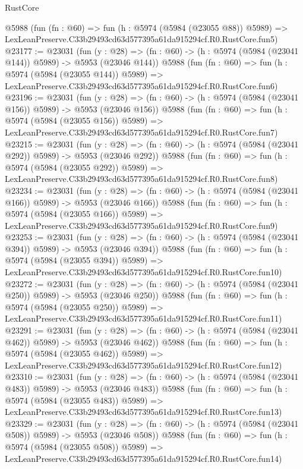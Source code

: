 \begin{lexlean}{RustCore}
\begin{coremodule}
    @5988
    (fun (fn : @60) =>
    fun (h : @5974 (@5984 (@23055 @88)) @5989) =>
    LexLeanPreserve.C33b29493cd63d577395a61da915294cf.R0.RustCore.fun5)
@23177 := @23031
    (fun (y : @28) => (fn : @60) -> (h : @5974 (@5984 (@23041 @144)) @5989) -> @5953 (@23046 @144))
    @5988
    (fun (fn : @60) =>
    fun (h : @5974 (@5984 (@23055 @144)) @5989) =>
    LexLeanPreserve.C33b29493cd63d577395a61da915294cf.R0.RustCore.fun6)
@23196 := @23031
    (fun (y : @28) => (fn : @60) -> (h : @5974 (@5984 (@23041 @156)) @5989) -> @5953 (@23046 @156))
    @5988
    (fun (fn : @60) =>
    fun (h : @5974 (@5984 (@23055 @156)) @5989) =>
    LexLeanPreserve.C33b29493cd63d577395a61da915294cf.R0.RustCore.fun7)
@23215 := @23031
    (fun (y : @28) => (fn : @60) -> (h : @5974 (@5984 (@23041 @292)) @5989) -> @5953 (@23046 @292))
    @5988
    (fun (fn : @60) =>
    fun (h : @5974 (@5984 (@23055 @292)) @5989) =>
    LexLeanPreserve.C33b29493cd63d577395a61da915294cf.R0.RustCore.fun8)
@23234 := @23031
    (fun (y : @28) => (fn : @60) -> (h : @5974 (@5984 (@23041 @166)) @5989) -> @5953 (@23046 @166))
    @5988
    (fun (fn : @60) =>
    fun (h : @5974 (@5984 (@23055 @166)) @5989) =>
    LexLeanPreserve.C33b29493cd63d577395a61da915294cf.R0.RustCore.fun9)
@23253 := @23031
    (fun (y : @28) => (fn : @60) -> (h : @5974 (@5984 (@23041 @394)) @5989) -> @5953 (@23046 @394))
    @5988
    (fun (fn : @60) =>
    fun (h : @5974 (@5984 (@23055 @394)) @5989) =>
    LexLeanPreserve.C33b29493cd63d577395a61da915294cf.R0.RustCore.fun10)
@23272 := @23031
    (fun (y : @28) => (fn : @60) -> (h : @5974 (@5984 (@23041 @250)) @5989) -> @5953 (@23046 @250))
    @5988
    (fun (fn : @60) =>
    fun (h : @5974 (@5984 (@23055 @250)) @5989) =>
    LexLeanPreserve.C33b29493cd63d577395a61da915294cf.R0.RustCore.fun11)
@23291 := @23031
    (fun (y : @28) => (fn : @60) -> (h : @5974 (@5984 (@23041 @462)) @5989) -> @5953 (@23046 @462))
    @5988
    (fun (fn : @60) =>
    fun (h : @5974 (@5984 (@23055 @462)) @5989) =>
    LexLeanPreserve.C33b29493cd63d577395a61da915294cf.R0.RustCore.fun12)
@23310 := @23031
    (fun (y : @28) => (fn : @60) -> (h : @5974 (@5984 (@23041 @483)) @5989) -> @5953 (@23046 @483))
    @5988
    (fun (fn : @60) =>
    fun (h : @5974 (@5984 (@23055 @483)) @5989) =>
    LexLeanPreserve.C33b29493cd63d577395a61da915294cf.R0.RustCore.fun13)
@23329 := @23031
    (fun (y : @28) => (fn : @60) -> (h : @5974 (@5984 (@23041 @508)) @5989) -> @5953 (@23046 @508))
    @5988
    (fun (fn : @60) =>
    fun (h : @5974 (@5984 (@23055 @508)) @5989) =>
    LexLeanPreserve.C33b29493cd63d577395a61da915294cf.R0.RustCore.fun14)

\end{coremodule}
\end{lexlean}
